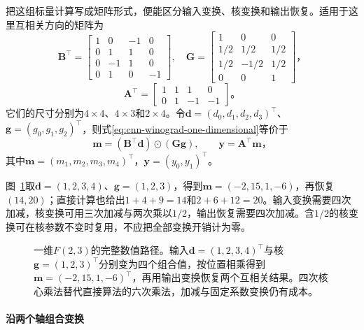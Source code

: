 把这组标量计算写成矩阵形式，便能区分输入变换、核变换和输出恢复。适用于这里互相关方向的矩阵为
\begin{equation}
  \bm B^\top=\begin{bmatrix}
    1&0&-1&0\\0&1&1&0\\0&-1&1&0\\0&1&0&-1
  \end{bmatrix},\quad
  \bm G=\begin{bmatrix}
    1&0&0\\1/2&1/2&1/2\\1/2&-1/2&1/2\\0&0&1
  \end{bmatrix}\text{，}
  \label{eq:cnn-winograd-matrices-bg}
\end{equation}
\begin{equation}
  \bm A^\top=\begin{bmatrix}1&1&1&0\\0&1&-1&-1\end{bmatrix}\text{。}
  \label{eq:cnn-winograd-matrix-a}
\end{equation}
它们的尺寸分别为$4\times4$、$4\times3$和$2\times4$。令$\bm d=(d_0,d_1,d_2,d_3)^\top$、$\bm g=(g_0,g_1,g_2)^\top$，则式\eqref{eq:cnn-winograd-one-dimensional}等价于
\begin{equation}
  \bm m=(\bm B^\top\bm d)\odot(\bm G\bm g),
  \qquad \bm y=\bm A^\top\bm m\text{，}
  \label{eq:cnn-winograd-vector-transform}
\end{equation}
其中$\bm m=(m_1,m_2,m_3,m_4)^\top$，$\bm y=(y_0,y_1)^\top$。

图~\ref{fig:cnn-winograd-example}取$\bm d=(1,2,3,4)$、$\bm g=(1,2,3)$，得到$\bm m=(-2,15,1,-6)$，再恢复$(14,20)$；直接计算也给出$1+4+9=14$和$2+6+12=20$。输入变换需要四次加减，核变换可用三次加减与两次乘以$1/2$，输出恢复需要四次加减。含$1/2$的核变换可在核参数不变时复用，不应把全部变换开销计为零。
\begin{figure}[htb]
  \centering
  
  \caption{一维$F(2,3)$的完整数值路径。输入$\bm d=(1,2,3,4)^\top$与核$\bm g=(1,2,3)^\top$分别变为四个组合值，按位置相乘得到$\bm m=(-2,15,1,-6)^\top$，再用输出变换恢复两个互相关结果。四次核心乘法替代直接算法的六次乘法，加减与固定系数变换仍有成本。}
  \label{fig:cnn-winograd-example}
\end{figure}

\paragraph{沿两个轴组合变换}

